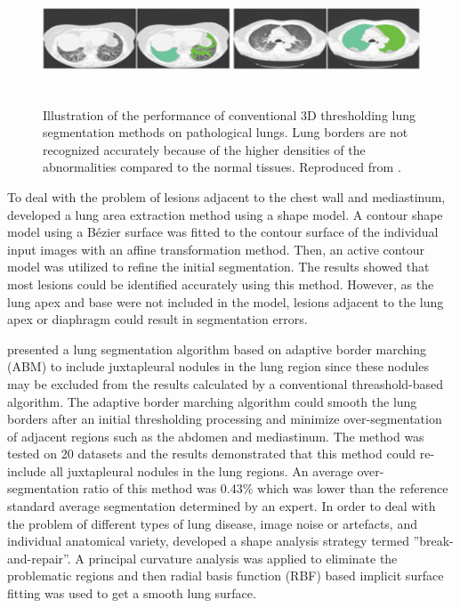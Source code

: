\begin{figure}[htbp]
  \centering 
  \includegraphics[height=1.5in]{Segmentation/Image/AbnormalLungSegmentation.png}
  \caption{Illustration of the performance of conventional 3D thresholding lung segmentation methods on pathological lungs. Lung borders are not recognized accurately because of the higher densities of the abnormalities compared to the normal tissues. Reproduced from \citep{van2013automated}.}
  \label{fig:AbnormalLungSegmentation}
\end{figure}

To deal with the problem of lesions adjacent to the chest wall and mediastinum, \citep{kitasaka2003lung} developed a lung area extraction method using a shape model. A contour shape model using a B\'ezier surface was fitted to the contour surface of the individual input images with an affine transformation method. Then, an active contour model was utilized to refine the initial segmentation. The results showed that most lesions could be identified accurately using this method. However, as the lung apex and base were not included in the model, lesions adjacent to the lung apex or diaphragm could result in segmentation errors.

\cite{pu2008adaptive} presented a lung segmentation algorithm based on adaptive border marching (ABM) to include juxtapleural nodules in the lung region since these nodules may be excluded from the results calculated by a conventional threashold-based algorithm. The adaptive border marching algorithm could smooth the lung borders after an initial thresholding processing and minimize over-segmentation of adjacent regions such as the abdomen and mediastinum. The method was tested on 20 datasets and the results demonstrated that this method could re-include all juxtapleural nodules in the lung regions. An average over-segmentation ratio of this method was 0.43\% which was lower than the reference standard average segmentation determined by an expert. In order to deal with the problem of different types of lung disease, image noise or artefacts, and individual anatomical variety, \cite{pu2011shape} developed a shape analysis strategy termed ''break-and-repair''. A principal curvature analysis was applied to eliminate the problematic regions and then radial basis function (RBF) based implicit surface fitting was used to get a smooth lung surface. 

